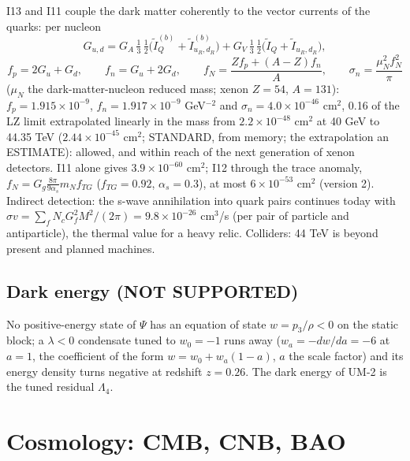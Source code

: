 \documentclass[
  10pt,
]{article}
\begin{document}
I13 and I11 couple the dark matter coherently to the vector currents of
the quarks: per nucleon
\[ G_{u,d} = G_A\,\tfrac13\,\tfrac12\big(\tilde I^{(b)}_Q + \tilde I^{(b)}_{u_R,d_R}\big) + G_V\,\tfrac13\,\tfrac12\big(\tilde I_Q + \tilde I_{u_R,d_R}\big),\]
\[ f_p = 2G_u + G_d,\qquad f_n = G_u + 2G_d,\qquad f_N = \frac{Zf_p + (A - Z)f_n}{A},\qquad \sigma_n = \frac{\mu_N^2f_N^2}{\pi} \]
(\(\mu_N\) the dark-matter-nucleon reduced mass; xenon \(Z = 54\),
\(A = 131\)): \(f_p = 1.915\times10^{-9}\), \(f_n = 1.917\times10^{-9}\)
GeV\(^{-2}\) and \(\sigma_n = 4.0\times10^{-46}\) cm\(^2\), 0.16 of the
LZ limit extrapolated linearly in the mass from \(2.2\times10^{-48}\)
cm\(^2\) at 40 GeV to 44.35 TeV (\(2.44\times10^{-45}\) cm\(^2\);
STANDARD, from memory; the extrapolation an ESTIMATE): allowed, and
within reach of the next generation of xenon detectors. I11 alone gives
\(3.9\times10^{-60}\) cm\(^2\); I12 through the trace anomaly,
\(f_N = G_g\frac{8\pi}{9\alpha_s}m_Nf_{TG}\) (\(f_{TG} = 0.92\),
\(\alpha_s = 0.3\)), at most \(6\times10^{-53}\) cm\(^2\) (version 2).
Indirect detection: the s-wave annihilation into quark pairs continues
today with \(\sigma v = \sum_fN_cG_f^2M^2/(2\pi) = 9.8\times10^{-26}\)
cm\(^3\)/s (per pair of particle and antiparticle), the thermal value
for a heavy relic. Colliders: 44 TeV is beyond present and planned
machines.

\hypertarget{dark-energy-not-supported}{%
\subsection{Dark energy (NOT
SUPPORTED)}\label{dark-energy-not-supported}}

No positive-energy state of \(\Psi\) has an equation of state
\(w = p_3/\rho < 0\) on the static block; a \(\lambda < 0\) condensate
tuned to \(w_0 = -1\) runs away (\(w_a = -dw/da = -6\) at \(a = 1\), the
coefficient of the form \(w = w_0 + w_a(1 - a)\), \(a\) the scale
factor) and its energy density turns negative at redshift \(z = 0.26\).
The dark energy of UM-2 is the tuned residual \(\Lambda_4\).

\hypertarget{cosmology-cmb-cnb-bao}{%
\section{Cosmology: CMB, CNB, BAO}\label{cosmology-cmb-cnb-bao}}
\end{document}
